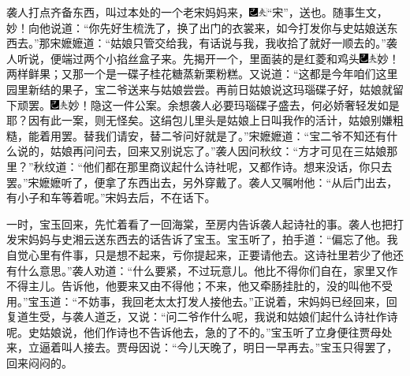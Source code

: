 袭人打点齐备东西，叫过本处的一个老宋妈妈来，{\includegraphics[width=3mm]{../Images/00003}\includegraphics[width=3mm]{../Images/00012}\footnotesize \kaishu ``宋''，送也。随事生文，妙！}向他说道：``你先好生梳洗了，换了出门的衣裳来，如今打发你与史姑娘送东西去。''那宋嬷嬷道：``姑娘只管交给我，有话说与我，我收拾了就好一顺去的。''袭人听说，便端过两个小掐丝盒子来。先揭开一个，里面装的是红菱和鸡头{\includegraphics[width=3mm]{../Images/00003}\includegraphics[width=3mm]{../Images/00012}\footnotesize \kaishu 妙！}两样鲜果；又那一个是一碟子桂花糖蒸新栗粉糕。又说道：``这都是今年咱们这里园里新结的果子，宝二爷送来与姑娘尝尝。再前日姑娘说这玛瑙碟子好，姑娘就留下顽罢。{\includegraphics[width=3mm]{../Images/00003}\includegraphics[width=3mm]{../Images/00012}\footnotesize \kaishu 妙！隐这一件公案。余想袭人必要玛瑙碟子盛去，何必娇奢轻发如是耶？因有此一案，则无怪矣。}这绢包儿里头是姑娘上日叫我作的活计，姑娘别嫌粗糙，能着用罢。替我们请安，替二爷问好就是了。''宋嬷嬷道：``宝二爷不知还有什么说的，姑娘再问问去，回来又别说忘了。''袭人因问秋纹：``方才可见在三姑娘那里？''秋纹道：``他们都在那里商议起什么诗社呢，又都作诗。想来没话，你只去罢。''宋嬷嬷听了，便拿了东西出去，另外穿戴了。袭人又嘱咐他：``从后门出去，有小子和车等着呢。''宋妈去后，不在话下。

一时，宝玉回来，先忙着看了一回海棠，至房内告诉袭人起诗社的事。袭人也把打发宋妈妈与史湘云送东西去的话告诉了宝玉。宝玉听了，拍手道：``偏忘了他。我自觉心里有件事，只是想不起来，亏你提起来，正要请他去。这诗社里若少了他还有什么意思。''袭人劝道：``什么要紧，不过玩意儿。他比不得你们自在，家里又作不得主儿。告诉他，他要来又由不得他；不来，他又牵肠挂肚的，没的叫他不受用。''宝玉道：``不妨事，我回老太太打发人接他去。''正说着，宋妈妈已经回来，回复道生受，与袭人道乏，又说：``问二爷作什么呢，我说和姑娘们起什么诗社作诗呢。史姑娘说，他们作诗也不告诉他去，急的了不的。''宝玉听了立身便往贾母处来，立逼着叫人接去。贾母因说：``今儿天晚了，明日一早再去。''宝玉只得罢了，回来闷闷的。

